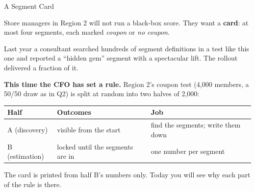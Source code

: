 \documentclass[aspectratio=169, 11pt, handout]{beamer}
\begin{document}
\begin{frame}{A Segment Card}

Store managers in Region 2 will not run a black-box score. They want a \textbf{card}: at most four segments, each marked \emph{coupon} or \emph{no coupon}.

\bigskip

Last year a consultant searched hundreds of segment definitions in a test like this one and reported a ``hidden gem'' segment with a spectacular lift. The rollout delivered a fraction of it.

\bigskip

\textbf{This time the CFO has set a rule.} Region 2's coupon test (4{,}000 members, a 50/50 draw as in Q2) is split at random into two halves of 2{,}000:

\begin{center}
\small
\begin{tabular}{lll}
\toprule
\textbf{Half} & \textbf{Outcomes} & \textbf{Job} \\
\midrule
A (discovery) & visible from the start & find the segments; write them down \\
B (estimation) & locked until the segments are in & one number per segment \\
\bottomrule
\end{tabular}
\end{center}

\medskip

The card is printed from half B's numbers only. Today you will see why each part of the rule is there.
\end{frame}
\end{document}
